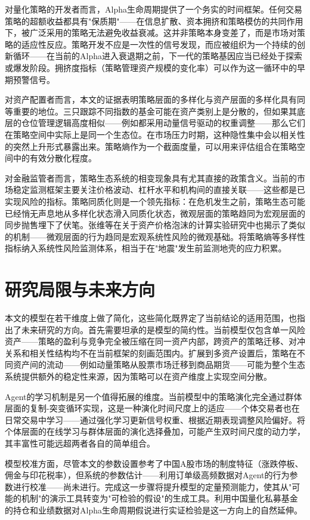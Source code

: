 对量化策略的开发者而言，Alpha生命周期提供了一个务实的时间框架。任何交易策略的超额收益都具有"保质期"——在信息扩散、资本拥挤和策略模仿的共同作用下，被广泛采用的策略无法避免收益衰减。这并非策略本身变差了，而是市场对策略的适应性反应。策略开发不应是一次性的信号发现，而应被组织为一个持续的创新循环——在当前的Alpha进入衰退期之前，下一代的策略基因应当已经处于探索或爆发阶段。拥挤度指标（策略管理资产规模的变化率）可以作为这一循环中的早期预警信号。

对资产配置者而言，本文的证据表明策略层面的多样化与资产层面的多样化具有同等重要的地位。三只跟踪不同指数的基金可能在资产类别上是分散的，但如果其底层的仓位管理逻辑高度相似——例如都采用动量信号驱动的权重调整——那么它们在策略空间中实际上是同一个生态位。在市场压力时期，这种隐性集中会以相关性的突然上升形式暴露出来。策略熵作为一个截面度量，可以用来评估组合在策略空间中的有效分散化程度。

对金融监管者而言，策略生态系统的相变现象具有尤其直接的政策含义。当前的市场稳定监测框架主要关注价格波动、杠杆水平和机构间的直接关联——这些都是已实现风险的指标。策略同质化则是一个领先指标：在危机发生之前，策略生态可能已经悄无声息地从多样化状态滑入同质化状态，微观层面的策略趋同为宏观层面的同步抛售埋下了伏笔。张维等\cite{zhangwei2009}在关于资产价格泡沫的计算实验研究中也揭示了类似的机制——微观层面的行为趋同是宏观系统性风险的微观基础。将策略熵等多样性指标纳入系统性风险监测体系，相当于在"地震"发生前监测地壳的应力积累。

\section{研究局限与未来方向}

本文的模型在若干维度上做了简化，这些简化既界定了当前结论的适用范围，也指出了未来研究的方向。首先需要坦承的是模型的简约性。当前模型仅包含单一风险资产——策略的盈利与竞争完全被压缩在同一资产内部，跨资产的策略迁移、对冲关系和相关性结构均不在当前框架的刻画范围内。扩展到多资产设置后，策略在不同资产间的流动——例如动量策略从股票市场迁移到商品期货——可能为整个生态系统提供额外的稳定性来源，因为策略可以在资产维度上实现空间分散。

Agent的学习机制是另一个值得拓展的维度。当前模型中的策略演化完全通过群体层面的复制-突变循环实现，这是一种演化时间尺度上的适应——个体交易者也在日常交易中学习——通过强化学习更新信号权重、根据近期表现调整风险偏好。将个体层面的在线学习与群体层面的演化选择叠加，可能产生双时间尺度的动力学，其丰富性可能远超两者各自的简单组合。

模型校准方面，尽管本文的参数设置参考了中国A股市场的制度特征（涨跌停板、佣金与印花税率），但系统的参数估计——利用订单级高频数据对Agent的行为参数进行校准——尚未进行。完成这一步骤将提升模型的定量预测能力，使其从"可能的机制"的演示工具转变为"可检验的假设"的生成工具。利用中国量化私募基金的持仓和业绩数据对Alpha生命周期假说进行实证检验是这一方向上的自然延伸。

